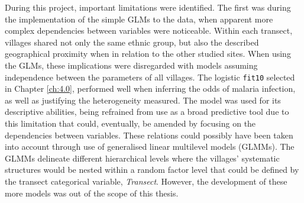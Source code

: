 During this project, important limitations were identified.
The first was during the implementation of the simple GLMs to the data, when apparent more complex dependencies between variables were noticeable.
Within each transect, villages shared not only the same ethnic group, but also the described geographical proximity when in relation to the other studied sites.
When using the GLMs, these implications were disregarded with models assuming independence between the parameters of all villages.
The logistic \texttt{fit10} selected in Chapter \ref{ch:4.0}, performed well when inferring the odds of malaria infection, as well as justifying the heterogeneity measured.
The model was used for its descriptive abilities, being refrained from use as a broad predictive tool due to this limitation that could, eventually, be amended by focusing on the dependencies between variables.
These relations could possibly have been taken into account through use of generalised linear multilevel models (GLMMs).
The GLMMs delineate different hierarchical levels where the villages' systematic structures would be nested within a random factor level that could be defined by the transect categorical variable, \textit{Transect}.
However, the development of these more models was out of the scope of this thesis.

